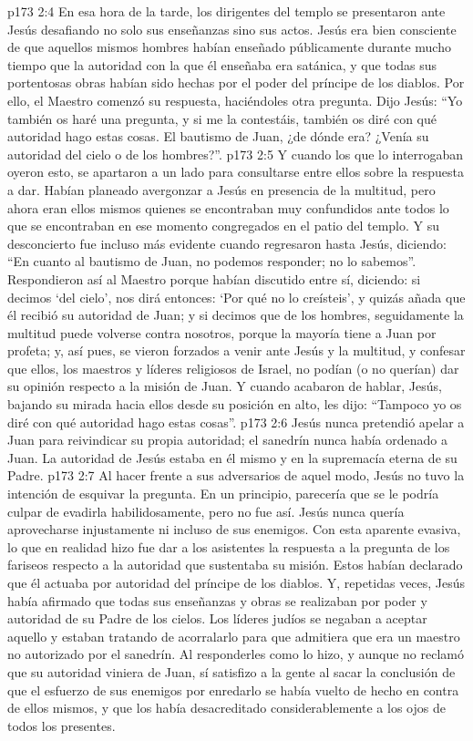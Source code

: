 \vs p173 2:4 En esa hora de la tarde, los dirigentes del templo se presentaron ante Jesús desafiando no solo sus enseñanzas sino sus actos. Jesús era bien consciente de que aquellos mismos hombres habían enseñado públicamente durante mucho tiempo que la autoridad con la que él enseñaba era satánica, y que todas sus portentosas obras habían sido hechas por el poder del príncipe de los diablos. Por ello, el Maestro comenzó su respuesta, haciéndoles otra pregunta. Dijo Jesús: “Yo también os haré una pregunta, y si me la contestáis, también os diré con qué autoridad hago estas cosas. El bautismo de Juan, ¿de dónde era? ¿Venía su autoridad del cielo o de los hombres?”.
\vs p173 2:5 Y cuando los que lo interrogaban oyeron esto, se apartaron a un lado para consultarse entre ellos sobre la respuesta a dar. Habían planeado avergonzar a Jesús en presencia de la multitud, pero ahora eran ellos mismos quienes se encontraban muy confundidos ante todos lo que se encontraban en ese momento congregados en el patio del templo. Y su desconcierto fue incluso más evidente cuando regresaron hasta Jesús, diciendo: “En cuanto al bautismo de Juan, no podemos responder; no lo sabemos”. Respondieron así al Maestro porque habían discutido entre sí, diciendo: si decimos ‘del cielo’, nos dirá entonces: ‘Por qué no lo creísteis’, y quizás añada que él recibió su autoridad de Juan; y si decimos que de los hombres, seguidamente la multitud puede volverse contra nosotros, porque la mayoría tiene a Juan por profeta; y, así pues, se vieron forzados a venir ante Jesús y la multitud, y confesar que ellos, los maestros y líderes religiosos de Israel, no podían (o no querían) dar su opinión respecto a la misión de Juan. Y cuando acabaron de hablar, Jesús, bajando su mirada hacia ellos desde su posición en alto, les dijo: “Tampoco yo os diré con qué autoridad hago estas cosas”.
\vs p173 2:6 \pc Jesús nunca pretendió apelar a Juan para reivindicar su propia autoridad; el sanedrín nunca había ordenado a Juan. La autoridad de Jesús estaba en él mismo y en la supremacía eterna de su Padre.
\vs p173 2:7 Al hacer frente a sus adversarios de aquel modo, Jesús no tuvo la intención de esquivar la pregunta. En un principio, parecería que se le podría culpar de evadirla habilidosamente, pero no fue así. Jesús nunca quería aprovecharse injustamente ni incluso de sus enemigos. Con esta aparente evasiva, lo que en realidad hizo fue dar a los asistentes la respuesta a la pregunta de los fariseos respecto a la autoridad que sustentaba su misión. Estos habían declarado que él actuaba por autoridad del príncipe de los diablos. Y, repetidas veces, Jesús había afirmado que todas sus enseñanzas y obras se realizaban por poder y autoridad de su Padre de los cielos. Los líderes judíos se negaban a aceptar aquello y estaban tratando de acorralarlo para que admitiera que era un maestro no autorizado por el sanedrín. Al responderles como lo hizo, y aunque no reclamó que su autoridad viniera de Juan, sí satisfizo a la gente al sacar la conclusión de que el esfuerzo de sus enemigos por enredarlo se había vuelto de hecho en contra de ellos mismos, y que los había desacreditado considerablemente a los ojos de todos los presentes.
